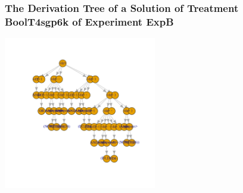  \begin{frame}
 \frametitle{ The Derivation Tree of a Solution of Treatment BoolT4sgp6k of Experiment ExpB }
 \begin{center}
\includegraphics[width=0.5\textwidth, angle=0]
{ExpBDerivationTreeFigure024.pdf}
 \end{center}
 \label{report/ExpBDerivationTreeFigure024.pdf}  
 \end{frame}

